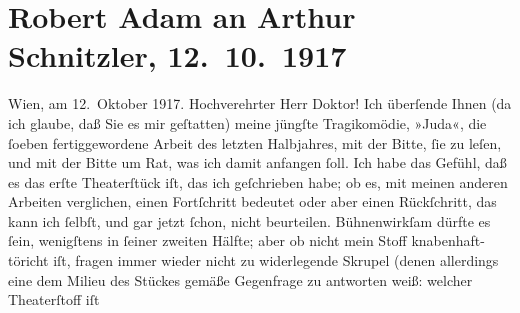 

         
         \renewcommand{\erwaehntePersonen}{Personen: Robert Adam}
         \renewcommand{\erwaehnteInstitutionen}{Institutionen: Burgtheater, Nationaltheater München}
         \renewcommand{\erwaehnteOrte}{Orte: Wien}
         \renewcommand{\erwaehnteWerke}{Werke: Das Ende des Judas}
               \section[Robert Adam an Arthur Schnitzler, 12. 10. 1917]{ Robert Adam an Arthur Schnitzler, 12. 10. 1917}\nopagebreak{}\rehead{ }\begin{ledgroupsized}[t]{13cm}\normalsize\beginnumbering \toendnotes[C]{\smallbreak\pagebreak[2]} 
\pstart
           \raggedleft{}{\pb}Wien, am 12. Oktober
                  1917.\pend
           \pstart{}Hochverehrter Herr Doktor!\pend\pstart
           Ich überſende Ihnen (da ich glaube, daß Sie es mir geſtatten) meine jüngſte
               Tragikomödie, »Juda«, die ſoeben fertiggewordene
               Arbeit des letzten Halbjahres, mit der Bitte, ſie zu leſen, und mit der Bitte um Rat,
               was ich damit anfangen ſoll. Ich habe das Gefühl, daß es das erſte Theaterſtück iſt,
               das ich geſchrieben habe; ob es, mit meinen anderen Arbeiten verglichen, einen
               Fortſchritt bedeutet oder aber einen Rückſchritt, das kann ich ſelbſt, und gar jetzt
               ſchon, nicht beurteilen. Bühnenwirkſam dürfte es ſein, wenigſtens in ſeiner zweiten
               Hälfte; aber ob nicht mein Stoff {\pb}knabenhaft-töricht
               iſt, fragen immer wieder nicht zu widerlegende Skrupel (denen allerdings eine dem
               Milieu des Stückes gemäße Gegenfrage zu antworten weiß: welcher Theaterſtoff iſt

\end{ledgroupsized}

